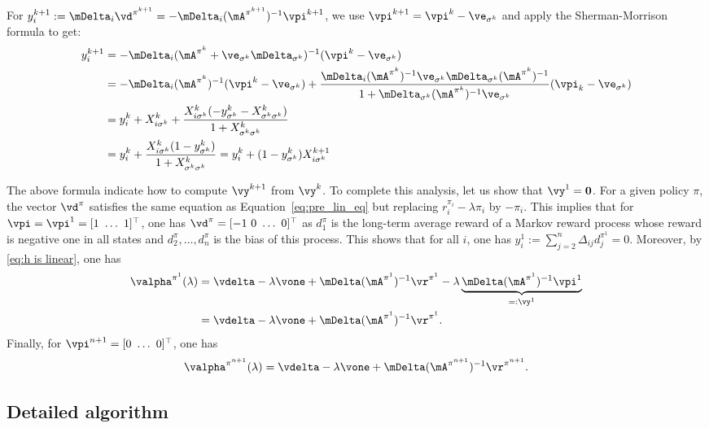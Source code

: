 For $y^{k+1}_i := \mDelta_{i}\vd^{\pi^{k+1}} = -\mDelta_i(\mA^{\pi^{k+1}})^{-1} \vpi^{k+1}$, we use $\vpi^{k+1}=\vpi^k - \ve_{\sigma^k}$ and apply the Sherman-Morrison formula to get:
\begin{align}
    y^{k+1}_i &= -\mDelta_i(\mA^{\pi^{k}}+\ve_{\sigma^k}\mDelta_{\sigma^k})^{-1} (\vpi^k-\ve_{\sigma^k})\nonumber\\
              &= -\mDelta_i (\mA^{\pi^{k}})^{-1}(\vpi^k-\ve_{\sigma^k})  + \frac{\mDelta_i (\mA^{\pi^{k}})^{-1} \ve_{\sigma^k}\mDelta_{\sigma^k}(\mA^{\pi^{k}})^{-1}}{1 + \mDelta_{\sigma^k} (\mA^{\pi^{k}})^{-1} \ve_{\sigma^k}} (\vpi_k-\ve_{\sigma^k})\nonumber\\
    &= y^k_i + X^k_{i\sigma^k} + \frac{X^k_{i\sigma^k}(-y^k_{\sigma^k} - X^{k}_{\sigma^k\sigma^k})}{1+X^{k}_{\sigma^k\sigma^k}}\nonumber\\
    &= y^k_i + \frac{X^k_{i\sigma^k}(1-y^k_{\sigma^k})}{1+X^{k}_{\sigma^k\sigma^k}} =y^k_i +(1-y^k_{\sigma^k})X^{k+1}_{i\sigma^k}\label{eq:y^k+1-i}
\end{align}

The above formula indicate how to compute $\vy^{k+1}$ from $\vy^k$. To complete this analysis, let us show that $\vy^1=\mathbf{0}$. For a given policy $\pi$, the vector $\vd^{\pi}$ satisfies the same equation as Equation~\eqref{eq:pre_lin_eq} but replacing $r^{\pi_i}_i-\lambda\pi_i$ by $-\pi_i$. This implies that for $\vpi=\vpi^1=[1\ \dots\ 1]^\top$, one has $\vd^\pi=[-1\ 0\ \dots\ 0]^\top$ as $d^\pi_1$ is the long-term average reward of a Markov reward process whose reward is negative one in all states and $d^\pi_2,\dots, d^\pi_n$ is the bias of this process.  This shows that for all $i$, one has
$y^{1}_i:=\sum_{j=2}^n\Delta_{ij}d_j^{\pi^{1}}=0$.
Moreover, by \eqref{eq:h is linear}, one has
\begin{align}
    \valpha^{\pi^1}(\lambda)
    &=\vdelta -\lambda\vone +\mDelta(\mA^{\pi^1})^{-1}\vr^{\pi^1} -\lambda\underbrace{\mDelta(\mA^{\pi^1})^{-1}\vpi^1}_{=:\vy^1} \nonumber\\
    &=\vdelta -\lambda\vone +\mDelta(\mA^{\pi^1})^{-1}\vr^{\pi^1}. \label{eq:b_pi_one}
\end{align}
Finally, for $\vpi^{n+1}=[0\ \dots\ 0]^\top$, one has
\begin{equation}
    \label{eq:b_pi_n1}
    \valpha^{\pi^{n+1}}(\lambda)
    =\vdelta -\lambda\vone +\mDelta(\mA^{\pi^{n+1}})^{-1}\vr^{\pi^{n+1}}.
\end{equation}

\subsection{Detailed algorithm}
\label{ssec:two_third_algo}

